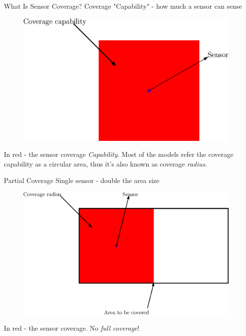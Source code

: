 \documentclass[t]{beamer}
\begin{document}
\begin{frame}[label=motivation3]{What Is Sensor Coverage?}
Coverage "Capability" - how much a sensor can sense

\begin{figure}[b]
\includegraphics[scale=0.5]{motivation/coverage-radius.eps}
\end{figure}

In red - the sensor coverage \emph{Capability}. Most of the models refer the coverage capability as a circular area, thus it's also known as coverage \emph{radius}.
\end{frame}
\begin{frame}[label=motivation4]{Partial Coverage}
Single sensor - double the area size

\begin{figure}[b]
\includegraphics[scale=0.5]{motivation/partial-coverage.eps}
\end{figure}
In red - the sensor coverage. No \emph{full coverage}!
\end{frame}
\end{document}
